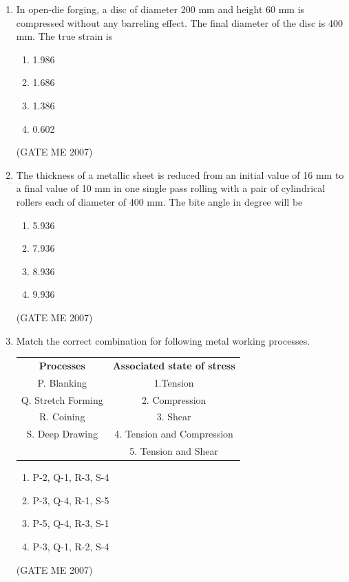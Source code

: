 \documentclass[journal]{IEEEtran}
\begin{document}
\begin{enumerate}
\item In open-die forging, a disc of diameter 200 mm and height 60 mm is compressed without any barreling effect. The final diameter of the disc is 400 mm. The true strain is
\begin{multicols}{4}
\begin{enumerate}
\item 1.986
\item 1.686
\item 1.386
\item 0.602
\end{enumerate}
\end{multicols}
\hfill (GATE ME 2007)

\item The thickness of a metallic sheet is reduced from an initial value of 16 mm to a final value of 10 mm in one single pass rolling with a pair of cylindrical rollers each of diameter of 400 mm. The bite angle in degree will be
\begin{multicols}{4}
\begin{enumerate}
\item 5.936
\item 7.936
\item 8.936
\item 9.936
\end{enumerate}
\end{multicols}
\hfill (GATE ME 2007)

\item Match the correct combination for following metal working processes.  

\begin{tabular}{cc}
\textbf{Processes} & \textbf{Associated state of stress} \\
P. Blanking        & 1.Tension \\
Q. Stretch Forming & 2. Compression \\ 
R. Coining         & 3. Shear \\  
S. Deep Drawing    & 4. Tension and Compression \\
                   & 5. Tension and Shear \\
\end{tabular}

\begin{multicols}{2}
\begin{enumerate}
\item P-2, Q-1, R-3, S-4
\item P-3, Q-4, R-1, S-5
\item P-5, Q-4, R-3, S-1
\item P-3, Q-1, R-2, S-4
\end{enumerate}
\end{multicols}
\hfill (GATE ME 2007)


\end{enumerate}
\end{document}

